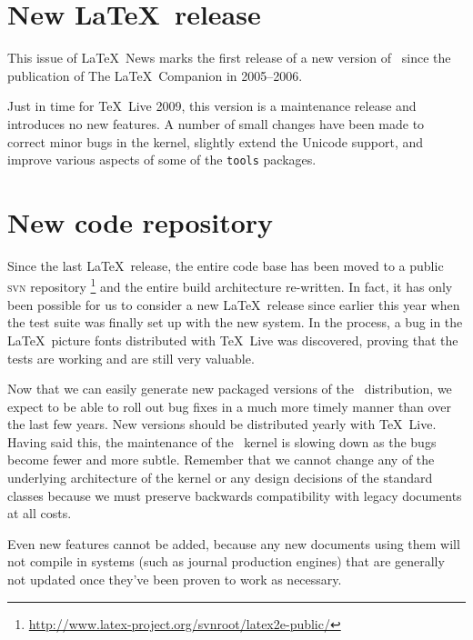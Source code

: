 \documentclass{ltnews}
\begin{document}
\maketitle

\section{New \LaTeX\ release}

This issue of \LaTeX~News marks the first release of a new version of
\LaTeXe\ since the publication of The \LaTeX\ Companion in 2005--2006.

Just in time for \TeX\ Live 2009, this version is a maintenance
release and introduces no new features. A number of small changes have
been made to correct minor bugs in the kernel, slightly extend the Unicode
support, and improve various
aspects of some of the \texttt{tools} packages.

\section{New code repository}

Since the last \LaTeX\ release, the entire code base has been moved
to a public \textsc{svn} repository%
\footnote{\url{http://www.latex-project.org/svnroot/latex2e-public/}}
and the entire build architecture re-written. In fact, it has only
been possible for us to consider a new \LaTeX\ release since earlier
this year when the test suite was finally set up with the new system.
In the process, a bug in the \LaTeX\ picture fonts distributed with
\TeX\ Live was discovered, proving that the
tests are working and are still very valuable.

Now that we can easily generate new packaged versions of the \LaTeXe\
distribution, we expect to be able to roll out bug fixes in a much
more timely manner than over the last few years. New versions should
be distributed yearly with \TeX\ Live. Having said this, the
maintenance of the \LaTeXe\ kernel is slowing down as the bugs become
fewer and more subtle. Remember that we cannot change any of the
underlying architecture of the kernel or any design decisions of the
standard classes because we must preserve backwards compatibility with
legacy documents at all costs.

Even new features cannot be added, because any new documents using
them will not compile in systems (such as journal production engines)
that are generally not updated once they've been proven to work as
necessary.
\end{document}
